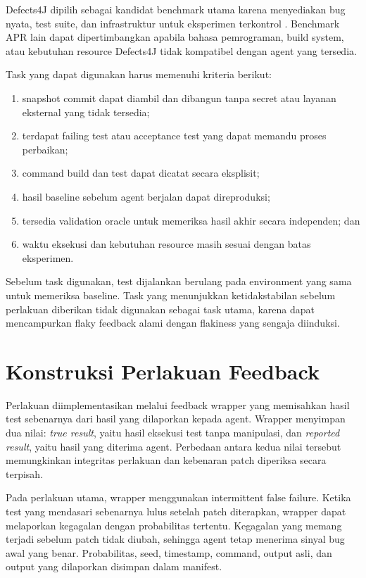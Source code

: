 Defects4J dipilih sebagai kandidat benchmark utama karena menyediakan bug nyata, test suite, dan infrastruktur untuk eksperimen terkontrol \cite{defects4j2014}. Benchmark APR lain dapat dipertimbangkan apabila bahasa pemrograman, build system, atau kebutuhan resource Defects4J tidak kompatibel dengan agent yang tersedia.

Task yang dapat digunakan harus memenuhi kriteria berikut:

\begin{enumerate}[leftmargin=*]
    \item snapshot commit dapat diambil dan dibangun tanpa secret atau layanan eksternal yang tidak tersedia;
    \item terdapat failing test atau acceptance test yang dapat memandu proses perbaikan;
    \item command build dan test dapat dicatat secara eksplisit;
    \item hasil baseline sebelum agent berjalan dapat direproduksi;
    \item tersedia validation oracle untuk memeriksa hasil akhir secara independen; dan
    \item waktu eksekusi dan kebutuhan resource masih sesuai dengan batas eksperimen.
\end{enumerate}

Sebelum task digunakan, test dijalankan berulang pada environment yang sama untuk memeriksa baseline. Task yang menunjukkan ketidakstabilan sebelum perlakuan diberikan tidak digunakan sebagai task utama, karena dapat mencampurkan flaky feedback alami dengan flakiness yang sengaja diinduksi.

\section{Konstruksi Perlakuan Feedback}

Perlakuan diimplementasikan melalui feedback wrapper yang memisahkan hasil test sebenarnya dari hasil yang dilaporkan kepada agent. Wrapper menyimpan dua nilai: \textit{true result}, yaitu hasil eksekusi test tanpa manipulasi, dan \textit{reported result}, yaitu hasil yang diterima agent. Perbedaan antara kedua nilai tersebut memungkinkan integritas perlakuan dan kebenaran patch diperiksa secara terpisah.

Pada perlakuan utama, wrapper menggunakan intermittent false failure. Ketika test yang mendasari sebenarnya lulus setelah patch diterapkan, wrapper dapat melaporkan kegagalan dengan probabilitas tertentu. Kegagalan yang memang terjadi sebelum patch tidak diubah, sehingga agent tetap menerima sinyal bug awal yang benar. Probabilitas, seed, timestamp, command, output asli, dan output yang dilaporkan disimpan dalam manifest.

